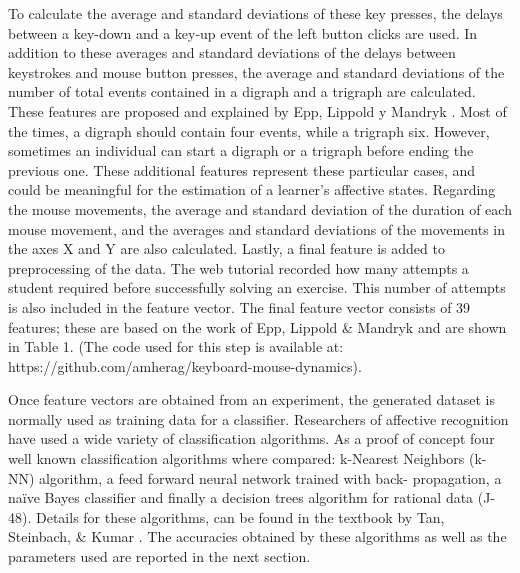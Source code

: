 \documentclass[conference]{IEEEtran}
\begin{document}
To calculate the average and standard deviations of these key presses, the delays
between a key-down and a key-up event of the left button clicks are used. In
addition to these averages and standard deviations of the delays between
keystrokes and mouse button presses, the average and standard deviations of the
number of total events contained in a digraph and a trigraph are calculated.
These features are proposed and explained by Epp, Lippold y Mandryk \cite{epp2011identifying}. Most
of the times, a digraph should contain four events, while a trigraph six.
However, sometimes an individual can start a digraph or a trigraph before ending
the previous one. These additional features represent these particular cases,
and could be meaningful for the estimation of a learner's affective states.
Regarding the mouse movements, the average and standard deviation of the
duration of each mouse movement, and the averages and standard deviations of the
movements in the axes X and Y are also calculated. Lastly, a final feature is
added to preprocessing of the data. The web tutorial recorded how many attempts
a student required before successfully solving an exercise. This number of
attempts is also included in the feature vector. The final feature vector
consists of 39 features; these are based on the work of Epp, Lippold \& Mandryk
\cite{epp2011identifying} and are shown in Table 1. (The code used for this step is available at:
https://github.com/amherag/keyboard-mouse-dynamics). %

Once feature vectors are obtained from an experiment, the generated dataset is
normally used as training data for a classifier. Researchers of affective
recognition have used a wide variety of classification algorithms. As a proof of
concept four well known classification algorithms where compared: k-Nearest
Neighbors (k-NN) algorithm, a feed forward neural network trained with back-
propagation, a na\"ive Bayes classifier and finally a decision trees algorithm for
rational data (J-48). Details for these algorithms, can be found in the textbook
by Tan, Steinbach, \& Kumar \cite{tan2006introduction}. The accuracies obtained by these algorithms
as well as the parameters used are reported in the next section.
\end{document}
